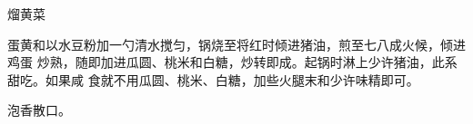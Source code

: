 %
%
%
%
%
%
%
\begin{recipe}{熘黄菜}

\ingredients


\preparation

蛋黄和以水豆粉加一勺清水搅匀，锅烧至将红时倾进猪油，煎至七八成火候，倾进鸡蛋
炒熟，随即加进瓜圆、桃米和白糖，炒转即成。起锅时淋上少许猪油，此系甜吃。如果咸
食就不用瓜圆、桃米、白糖，加些火腿末和少许味精即可。

\features

泡香散口。

\end{recipe}

